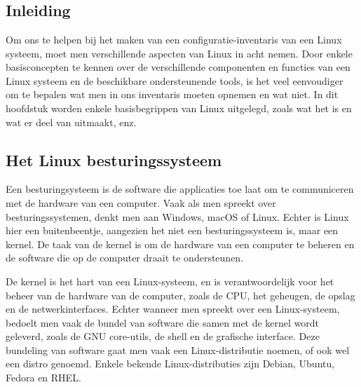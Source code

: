 
\chapter{}%
\label{ch:linux-server-concepten}

\section{Inleiding}
\label{linux_inleiding}

Om ons te helpen bij het maken van een configuratie-inventaris van een Linux systeem, moet men verschillende aspecten van Linux in acht nemen.
Door enkele basisconcepten te kennen over de verschillende componenten en functies van een Linux systeem en de beschikbare ondersteunende tools, is het veel eenvoudiger om te bepalen wat men in ons inventaris moeten opnemen en wat niet.
In dit hoofdstuk worden enkele basisbegrippen van Linux uitgelegd, zoals wat het is en wat er deel van uitmaakt, enz.

\section{Het Linux besturingssysteem}
\label{linux_linux_besturingssysteem}

Een besturingsysteem is de software die applicaties toe laat om te communiceren met de hardware van een computer.
Vaak als men spreekt over besturingssystemen, denkt men aan Windows, macOS of Linux.
Echter is Linux hier een buitenbeentje, aangezien het niet een besturingssysteem is, maar een kernel.
De taak van de kernel is om de hardware van een computer te beheren en de software die op de computer draait te ondersteunen.

De kernel is het hart van een Linux-systeem, en is verantwoordelijk voor het beheer van de hardware van de computer, zoals de CPU, het geheugen, de opslag en de netwerkinterfaces.
Echter wanneer men spreekt over een Linux-systeem, bedoelt men vaak de bundel van software die samen met de kernel wordt geleverd, zoals de GNU core-utils, de shell en de grafische interface.
Deze bundeling van software gaat men vaak een Linux-distributie noemen, of ook wel een distro genoemd.
Enkele bekende Linux-distributies zijn Debian, Ubuntu, Fedora en RHEL.

